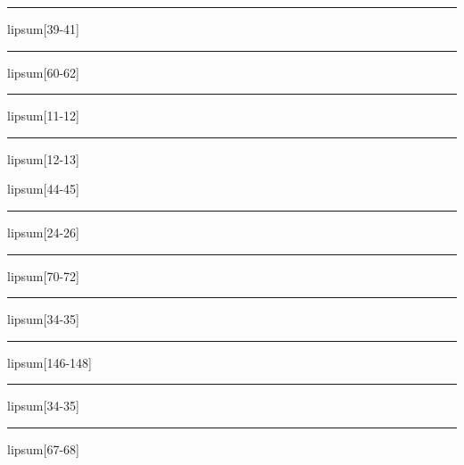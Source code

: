 \documentclass[11pt,a4paper]{article}
\begin{document}
\begin{simplewrap}
  \textcolor{red!10}{\rule{5.0cm}{9.3cm}}
\end{simplewrap}
lipsum[39-41]

\begin{simplewrap}
  \textcolor{cyan!14}{\rule{5.2cm}{2.8cm}}
\end{simplewrap}
lipsum[60-62]

\begin{simplewrap}
  \textcolor{violet!26}{\rule{4.4cm}{2.8cm}}
\end{simplewrap}
lipsum[11-12]

\begin{simplewrap}
  \textcolor{lime!53}{\rule{3.9cm}{7.9cm}}
\end{simplewrap}
lipsum[12-13]

lipsum[44-45]

\begin{simplewrap}
  \textcolor{brown!32}{\rule{5.7cm}{9.6cm}}
\end{simplewrap}
lipsum[24-26]

\begin{simplewrap}
  \textcolor{brown!21}{\rule{3.3cm}{5.2cm}}
\end{simplewrap}
lipsum[70-72]

\begin{simplewrap}
  \textcolor{red!36}{\rule{4.9cm}{8.4cm}}
\end{simplewrap}
lipsum[34-35]

\begin{simplewrap}
  \textcolor{blue!20}{\rule{3.3cm}{9.3cm}}
\end{simplewrap}
lipsum[146-148]

\begin{simplewrap}
  \textcolor{cyan!49}{\rule{4.1cm}{4.9cm}}
\end{simplewrap}
lipsum[34-35]

\begin{simplewrap}
  \textcolor{red!17}{\rule{5.7cm}{5.5cm}}
\end{simplewrap}
lipsum[67-68]
\end{document}
